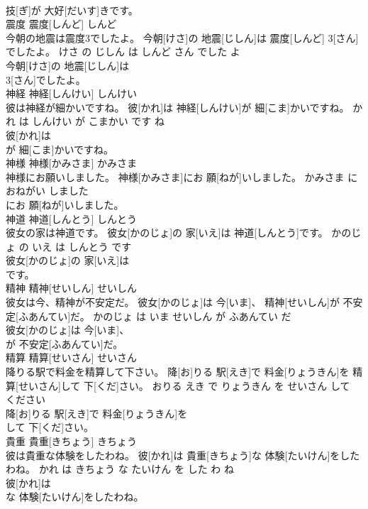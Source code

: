 \documentclass[8pt]{extreport}
\begin{document}
\begin{CJK}{UTF8}{min}
\\	技[ぎ]が 大好[だいす]きです。			
\\	震度	震度[しんど]	しんど	
\\	今朝の地震は震度3でしたよ。	今朝[けさ]の 地震[じしん]は 震度[しんど] 3[さん]でしたよ。	けさ の じしん は しんど さん でした よ	
\\	今朝[けさ]の 地震[じしん]は
\\	3[さん]でしたよ。			
\\	神経	神経[しんけい]	しんけい	
\\	彼は神経が細かいですね。	彼[かれ]は 神経[しんけい]が 細[こま]かいですね。	かれ は しんけい が こまかい です ね	
\\	彼[かれ]は
\\	が 細[こま]かいですね。			
\\	神様	神様[かみさま]	かみさま	
\\	神様にお願いしました。	神様[かみさま]にお 願[ねが]いしました。	かみさま に おねがい しました	
\\	にお 願[ねが]いしました。			
\\	神道	神道[しんとう]	しんとう	
\\	彼女の家は神道です。	彼女[かのじょ]の 家[いえ]は 神道[しんとう]です。	かのじょ の いえ は しんとう です	
\\	彼女[かのじょ]の 家[いえ]は
\\	です。			
\\	精神	精神[せいしん]	せいしん	
\\	彼女は今、精神が不安定だ。	彼女[かのじょ]は 今[いま]、 精神[せいしん]が 不安定[ふあんてい]だ。	かのじょ は いま せいしん が ふあんてい だ	
\\	彼女[かのじょ]は 今[いま]、
\\	が 不安定[ふあんてい]だ。			
\\	精算	精算[せいさん]	せいさん	
\\	降りる駅で料金を精算して下さい。	降[お]りる 駅[えき]で 料金[りょうきん]を 精算[せいさん]して 下[くだ]さい。	おりる えき で りょうきん を せいさん して ください	
\\	降[お]りる 駅[えき]で 料金[りょうきん]を
\\	して 下[くだ]さい。			
\\	貴重	貴重[きちょう]	きちょう	
\\	彼は貴重な体験をしたわね。	彼[かれ]は 貴重[きちょう]な 体験[たいけん]をしたわね。	かれ は きちょう な たいけん を した わ ね	
\\	彼[かれ]は
\\	な 体験[たいけん]をしたわね。			

\end{CJK}
\end{document}
